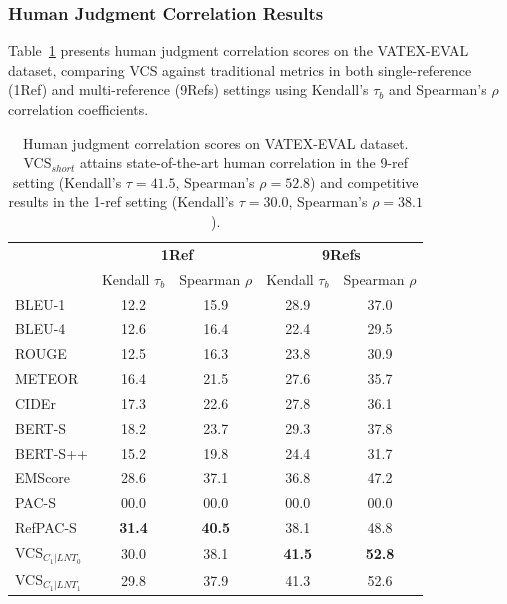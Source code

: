 \documentclass[main.tex]{subfiles}
\begin{document}
\subsubsection{Human Judgment Correlation Results}

Table~\ref{tab:vatex-eval} presents human judgment correlation scores on the VATEX-EVAL dataset, comparing VCS against traditional metrics in both single-reference (1Ref) and multi-reference (9Refs) settings using Kendall's $\tau_b$ and Spearman's $\rho$ correlation coefficients.

\begin{table}[t]
  \centering
  \normalsize
  \setlength{\tabcolsep}{0.75mm}
  \begin{tabular}{l@{\hspace{0.1mm}}cccc}
    \hline
    & \multicolumn{2}{c}{\textbf{1Ref}} & \multicolumn{2}{c}{\textbf{9Refs}} \\
    \cline{2-3} \cline{4-5}
    & Kendall $\tau_b$ & Spearman $\rho$ & Kendall $\tau_b$ & Spearman $\rho$ \\
    \hline
    BLEU-1 & 12.2 & 15.9 & 28.9 & 37.0 \\
    BLEU-4 & 12.6 & 16.4 & 22.4 & 29.5 \\
    ROUGE & 12.5 & 16.3 & 23.8 & 30.9 \\
    METEOR & 16.4 & 21.5 & 27.6 & 35.7 \\
    CIDEr & 17.3 & 22.6 & 27.8 & 36.1 \\
    \hline
    BERT-S & 18.2 & 23.7 & 29.3 & 37.8 \\
    BERT-S++ & 15.2 & 19.8 & 24.4 & 31.7 \\
    \hline
    EMScore & 28.6 & 37.1 & 36.8 & 47.2 \\
    PAC-S & 00.0 & 00.0 & 00.0 & 00.0 \\
    RefPAC-S & \textbf{31.4} & \textbf{40.5} & 38.1 & 48.8 \\
    \hline
    VCS$_{C_1|LNT_0}$ & 30.0 & 38.1 & \textbf{41.5} & \textbf{52.8} \\
    VCS$_{C_1|LNT_1}$ & 29.8 & 37.9 & 41.3 & 52.6 \\
    \hline
  \end{tabular}
  \caption{Human judgment correlation scores on VATEX-EVAL dataset. VCS$_{short}$ attains state-of-the-art human correlation in the 9-ref setting (Kendall's $\tau = 41.5$, Spearman's $\rho = 52.8$) and competitive results in the 1-ref setting (Kendall's $\tau = 30.0$, Spearman's $\rho = 38.1$).}
  \label{tab:vatex-eval}
\end{table}
\end{document}
